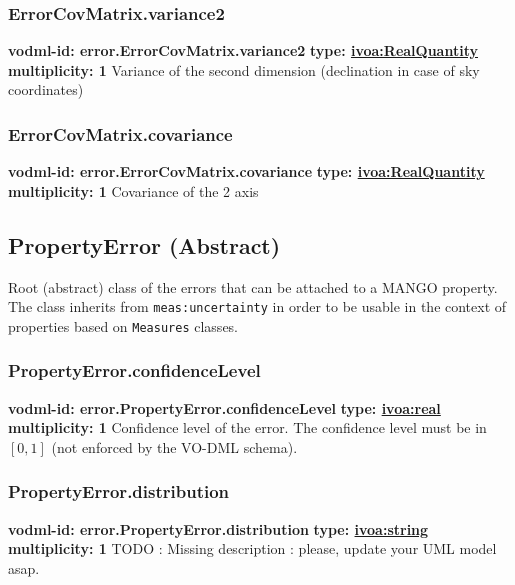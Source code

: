     \subsubsection{ErrorCovMatrix.variance2}
    \textbf{vodml-id: error.ErrorCovMatrix.variance2} \newline
    \textbf{type: \hyperref[sect:ivoa]{ivoa:RealQuantity}} \newline
    \textbf{multiplicity: 1} \newline
    Variance of the second dimension (declination in case of sky coordinates)

    \subsubsection{ErrorCovMatrix.covariance}
    \textbf{vodml-id: error.ErrorCovMatrix.covariance} \newline
    \textbf{type: \hyperref[sect:ivoa]{ivoa:RealQuantity}} \newline
    \textbf{multiplicity: 1} \newline
    Covariance of the 2 axis

  \subsection{PropertyError (Abstract)}
    \label{sect:error.PropertyError}
    Root (abstract) class of the errors that can be attached to a MANGO property. The class inherits from \texttt{meas:uncertainty} in order to be usable in the context of properties based on \texttt{Measures} classes.

    \subsubsection{PropertyError.confidenceLevel}
    \textbf{vodml-id: error.PropertyError.confidenceLevel} \newline
    \textbf{type: \hyperref[sect:ivoa]{ivoa:real}} \newline
    \textbf{multiplicity: 1} \newline
    Confidence level of the error. The confidence level must be in $[0, 1]$ (not enforced by the VO-DML schema).

    \subsubsection{PropertyError.distribution}
    \textbf{vodml-id: error.PropertyError.distribution} \newline
    \textbf{type: \hyperref[sect:ivoa]{ivoa:string}} \newline
    \textbf{multiplicity: 1} \newline
    TODO : Missing description : please, update your UML model asap.

